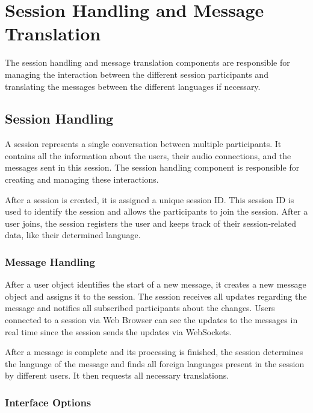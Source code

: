 \chapter{Session Handling and Message Translation}

\label{SessionHandlingAndMessageTranslation}

The session handling and message translation components are responsible for managing the interaction between the 
different session participants and translating the messages between the different languages if necessary.


\section{Session Handling}

A session represents a single conversation between multiple participants. It contains all the information about the 
users, their audio connections, and the messages sent in this session. The session handling component is 
responsible for creating and managing these interactions.

After a session is created, it is assigned a unique session ID. This session ID is used to identify the session and 
allows the participants to join the session. After a user joins, the session registers the user and keeps track of 
their session-related data, like their determined language.

\subsection{Message Handling}

After a user object identifies the start of a new message, it creates a new message object and assigns it to the 
session. The session receives all updates regarding the message and notifies all subscribed participants about the 
changes. Users connected to a session via Web Browser can see the updates to the messages in real time since the 
session sends the updates via WebSockets.

After a message is complete and its processing is finished, the session determines the language of the message and 
finds all foreign languages present in the session by different users. It then requests all necessary translations.

\subsection{Interface Options}

